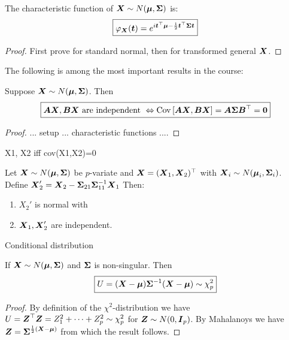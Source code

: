 \begin{theorem}
    The characteristic function of $\X\sim N(\M, \SS)$ is:
    \begin{equation}
        \boxed{\phi_{\X}(\mt) = e^{ i \mt^\top\M - \frac{1}{2}\mt^\top\SS\mt}}
    \end{equation}
\end{theorem}
\begin{proof}
    First prove for standard normal, then for transformed general $\X$. 
\end{proof}

The following is among the most important results in the course:
\begin{theorem}
     Suppose $\X\sim N(\M, \SS)$. Then 
    \begin{equation}
        \boxed{\mA \X, \mB \X \textrm{ are independent } \Leftrightarrow \cov{\mA \X, \mB \X} = \mA\SS\mB^\top = \zero}
    \end{equation} 
\end{theorem}
\begin{proof}
    ... setup ... characteristic functions ....
\end{proof}
\begin{corollary}
    X1, X2 iff cov(X1,X2)=0
\end{corollary}



\begin{theorem}
    Let $\X\sim N(\M, \SS)$ be $p$-variate and $\X=(\X_1,\X_2)^\top$ with $\X_i\sim N(\M_i, \SS_i)$. Define $\X_2' = \X_2 - \SS_{21}\SS_{11}^{-1} \X_1$ Then:
    \begin{enumerate}
        \item $X_2'$ is normal with \TODO{}
        \item $\X_1, \X_2'$ are independent.
    \end{enumerate}
\end{theorem}

\begin{theorem}
    Conditional distribution\TODO{}
\end{theorem}

\begin{theorem}
    If $\X\sim N(\M, \SS)$ and $\SS$ is non-singular. Then 
    $$
        \boxed{U = (\X-\M)\SS^{-1}(\X-\M) \sim \chi^2_p}
    $$
\end{theorem}
\begin{proof}
    By definition of the $\chi^2$-distribution we have $U=\Z^\top\Z=Z_1^2+\dots+Z_p^2 \sim \chi_p^2$ for $\Z\sim N(0, \mI_p)$. By Mahalanoys\TODO{} we have $\Z=\SS^{\frac{1}{2}(\X-\M)}$ from which the result follows. 
\end{proof}



